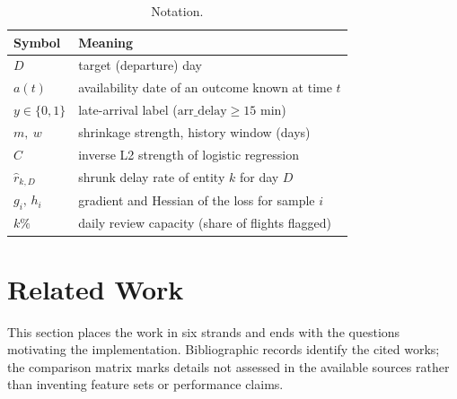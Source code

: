 \documentclass[conference]{IEEEtran}
\newcommand{\tabsize}{\footnotesize}
\begin{document}
\begin{table}[t]
\caption{Notation.}
\label{tab:notation}
\centering\tabsize
\begin{tabular}{@{}lP{6.2cm}@{}}
\toprule
Symbol & Meaning\\
\midrule
$D$ & target (departure) day\\
$a(t)$ & availability date of an outcome known at time $t$\\
$y\in\{0,1\}$ & late-arrival label ($\text{arr\_delay}\ge15$ min)\\
$m,\ w$ & shrinkage strength, history window (days)\\
$C$ & inverse L2 strength of logistic regression\\
$\hat r_{k,D}$ & shrunk delay rate of entity $k$ for day $D$\\
$g_i,\,h_i$ & gradient and Hessian of the loss for sample $i$\\
$k\%$ & daily review capacity (share of flights flagged)\\
\bottomrule
\end{tabular}
\end{table}

\section{Related Work}\label{sec:related}
This section places the work in six strands and ends with the questions motivating the implementation. Bibliographic records identify the cited works; the comparison matrix marks details not assessed in the available sources rather than inventing feature sets or performance claims.
\end{document}
